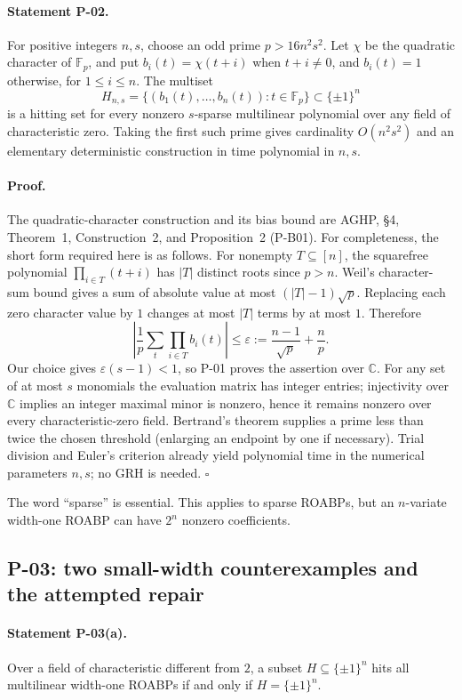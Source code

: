 \documentclass[11pt,a4paper]{article}
\theoremstyle{definition}\newtheorem{definition}{Definition}
\begin{document}
\paragraph{Statement P-02.}
For positive integers $n,s$, choose an odd prime $p>16n^2s^2$. Let $\chi$ be the quadratic character of $\mathbb F_p$, and put $b_i(t)=\chi(t+i)$ when $t+i\ne0$, and $b_i(t)=1$ otherwise, for $1\le i\le n$. The multiset
\[
 H_{n,s}=\{(b_1(t),\ldots,b_n(t)):t\in\mathbb F_p\}\subset\{\pm1\}^n
\]
is a hitting set for every nonzero $s$-sparse multilinear polynomial over any field of characteristic zero. Taking the first such prime gives cardinality $O(n^2s^2)$ and an elementary deterministic construction in time polynomial in $n,s$.
\paragraph{Proof.}
The quadratic-character construction and its bias bound are AGHP, \S4, Theorem~1, Construction~2, and Proposition~2 (P-B01). For completeness, the short form required here is as follows. For nonempty $T\subseteq[n]$, the squarefree polynomial $\prod_{i\in T}(t+i)$ has $|T|$ distinct roots since $p>n$. Weil's character-sum bound gives a sum of absolute value at most $(|T|-1)\sqrt p$. Replacing each zero character value by $1$ changes at most $|T|$ terms by at most $1$. Therefore
\[
 \left|\frac1p\sum_t\prod_{i\in T}b_i(t)\right|
 \le \varepsilon:=\frac{n-1}{\sqrt p}+\frac np.
\]
Our choice gives $\varepsilon(s-1)<1$, so P-01 proves the assertion over $\mathbb C$. For any set of at most $s$ monomials the evaluation matrix has integer entries; injectivity over $\mathbb C$ implies an integer maximal minor is nonzero, hence it remains nonzero over every characteristic-zero field. Bertrand's theorem supplies a prime less than twice the chosen threshold (enlarging an endpoint by one if necessary). Trial division and Euler's criterion already yield polynomial time in the numerical parameters $n,s$; no GRH is needed. $\square$

The word ``sparse'' is essential. This applies to sparse ROABPs, but an $n$-variate width-one ROABP can have $2^n$ nonzero coefficients.

\subsection{P-03: two small-width counterexamples and the attempted repair}
\paragraph{Statement P-03(a).}
Over a field of characteristic different from $2$, a subset $H\subseteq\{\pm1\}^n$ hits all multilinear width-one ROABPs if and only if $H=\{\pm1\}^n$.
\end{document}
